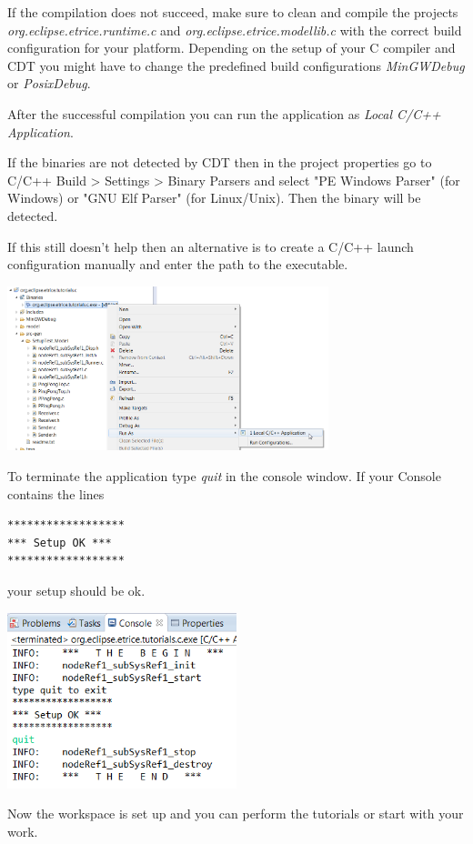 If the compilation does not succeed, make sure to clean and compile the projects \emph{org.eclipse.etrice.runtime.c} and \emph{org.eclipse.etrice.modellib.c} with the correct build configuration for your platform. Depending on the setup of your C compiler and CDT you might have to change the predefined build configurations \emph{MinGWDebug} or \emph{PosixDebug}.

After the successful compilation you can run the application as \emph{Local C/C++ Application}.

If the binaries are not detected by CDT then in the project properties go to C/C++ Build > Settings > Binary Parsers and select "PE Windows Parser" (for Windows)
or "GNU Elf Parser" (for Linux/Unix). Then the binary will be detected.

If this still doesn't help then an alternative is to create a C/C++ launch configuration manually and enter the path to the executable.

\includegraphics[width=0.7\textwidth]{images/014-08-RunAsC-CPP-Application.png}

To terminate the application type \emph{quit} in the console window. If your Console contains the lines
\begin{verbatim}
******************
*** Setup OK ***
******************
\end{verbatim}
your setup should be ok.

\includegraphics[width=0.5\textwidth]{images/014-09-ConsoleWithSetupOk.png} 

Now the workspace is set up and you can perform the tutorials or start with your work.

